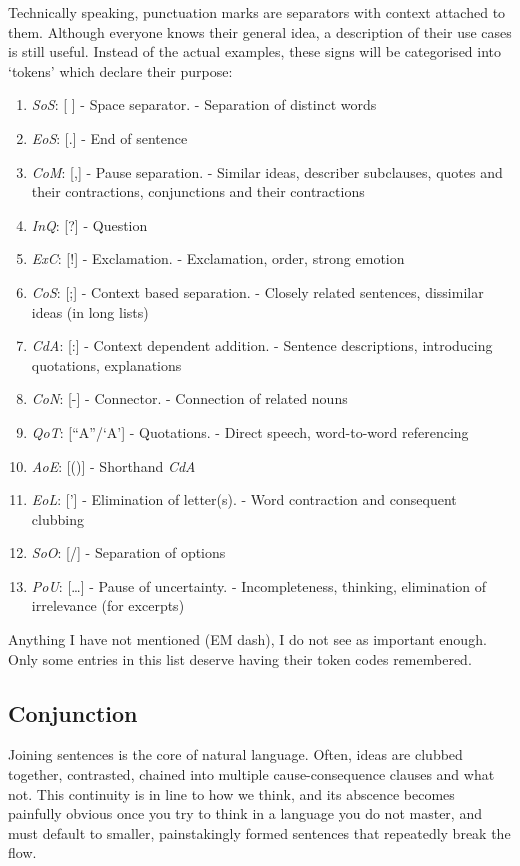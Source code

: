 Technically speaking, punctuation marks are separators with context attached to them. Although everyone knows their general idea, a description of their use cases is still  useful. Instead of the actual examples, these signs will be categorised into `tokens' which declare their purpose:
\begin{enumerate}
    \item \textit{SoS}: [ ] - Space separator.  - Separation of distinct words
    \item \textit{EoS}: [.] - End of  sentence
    \item \textit{CoM}: [,] - Pause separation.  - Similar ideas, describer subclauses, quotes and their contractions, conjunctions and their contractions
    \item \textit{InQ}: [?] - Question
    \item \textit{ExC}: [!] - Exclamation.  - Exclamation, order, strong emotion
    \item \textit{CoS}: [;] - Context based separation.  - Closely related sentences, dissimilar ideas (in long lists)
    \item \textit{CdA}: [:] - Context dependent addition.  - Sentence descriptions, introducing quotations, explanations
    \item \textit{CoN}: [-] - Connector.  - Connection of related nouns 
    \item \textit{QoT}: [``A''/`A'] - Quotations.  - Direct speech, word-to-word referencing
    \item \textit{AoE}: [()] - Shorthand \textit{CdA}
    \item \textit{EoL}: ['] - Elimination of letter(s).  - Word contraction and consequent clubbing
    \item \textit{SoO}: [/] - Separation of options
    \item \textit{PoU}: [\ldots] - Pause of uncertainty.  - Incompleteness, thinking, elimination of irrelevance (for excerpts)
\end{enumerate}
Anything I have not mentioned (EM dash), I do not see as important enough. Only some entries in this list deserve having their token codes remembered.
\subsection{Conjunction}
Joining sentences is the core of natural language. Often, ideas are clubbed together, contrasted, chained into multiple cause-consequence clauses and what not. This continuity is in line to how we think, and its abscence becomes painfully obvious once you try to think in a language you do not master, and must default to smaller, painstakingly formed sentences that repeatedly break the flow.

